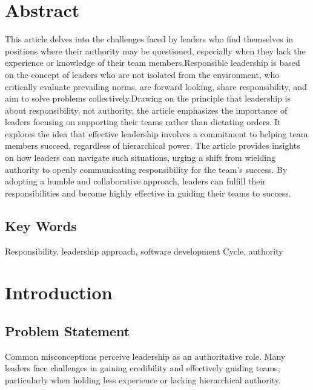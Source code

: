 \documentclass[a4paper,12pt]{report}
\begin{document}
\begin{titlepage}
	
	\vfill %
	
\end{titlepage}


\fontsize{14}{16}\selectfont \tableofcontents
\fontsize{14}{16}\selectfont \chapter{Abstract}
\fontsize{14}{35}\selectfont This article delves into the challenges faced by leaders who find themselves in positions where their authority may be questioned, especially when they lack the experience or knowledge of their team members.Responsible leadership is based on the concept of leaders who are not isolated from the environment, who critically evaluate prevailing norms, are forward looking, share responsibility, and aim to solve problems collectively.Drawing on the principle that leadership is about responsibility, not authority, the article emphasizes the importance of leaders focusing on supporting their teams rather than dictating orders. It explores the idea that effective leadership involves a commitment to helping team members succeed, regardless of hierarchical power. The article provides insights on how leaders can navigate such situations, urging a shift from wielding authority to openly communicating responsibility for the team's success. By adopting a humble and collaborative approach, leaders can fulfill their responsibilities and become highly effective in guiding their teams to success.
\fontsize{14}{16}\selectfont \section{Key Words}
\fontsize{14}{20}\selectfont Responsibility, leadership approach, software development Cycle, authority
\fontsize{14}{16}\selectfont \chapter{Introduction}

\fontsize{14}{16}\selectfont \section{Problem Statement}
\fontsize{14}{20}\selectfont Common misconceptions perceive leadership as an authoritative role. Many leaders face challenges in gaining credibility and effectively guiding teams, particularly when holding less experience or lacking hierarchical authority.
\end{document}
